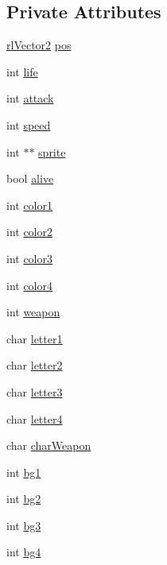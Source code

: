 \subsection*{Private Attributes}
\begin{DoxyCompactItemize}
\item 
\hyperlink{classrl_vector2}{rl\+Vector2} \hyperlink{class_entity_aedf0798376823559596033bfd52c1fa0}{pos}
\item 
int \hyperlink{class_entity_ab5a58d961897fb12cfb9a2a34cb80fe4}{life}
\item 
int \hyperlink{class_entity_ad7e09a1222e8cd9de3a843df03ebc37f}{attack}
\item 
int \hyperlink{class_entity_a12ea871d945d59cbf57b8f8f7d2179ed}{speed}
\item 
int $\ast$$\ast$ \hyperlink{class_entity_a0d38325f20f4355bf355e165b99231e6}{sprite}
\item 
bool \hyperlink{class_entity_a0d09a7e175d9dcfbfb359e5f74f2e692}{alive}
\item 
int \hyperlink{class_entity_ad22d4a6ba74304e1dbdd1a2a40aefb97}{color1}
\item 
int \hyperlink{class_entity_ade7823e7e53607944c4b439a1d6c2ddd}{color2}
\item 
int \hyperlink{class_entity_a7f8d011c124da5b94bd7582b3c87be67}{color3}
\item 
int \hyperlink{class_entity_a7eaf83e231e34f877a6a1e56631ea61d}{color4}
\item 
int \hyperlink{class_entity_aa4361bec43383b3fdfe53f53e71c93a6}{weapon}
\item 
char \hyperlink{class_entity_ad1de5aed7c640d39455f87ba0d3c192b}{letter1}
\item 
char \hyperlink{class_entity_a4522c9c985e62621e9bd5539b7207886}{letter2}
\item 
char \hyperlink{class_entity_a41b0a2fadb4a06a6b1fdec7d8099d529}{letter3}
\item 
char \hyperlink{class_entity_a1a7a52c0bfe4ec3f01715f7391c6ef2e}{letter4}
\item 
char \hyperlink{class_entity_a26e1ea3ec585b366da97be2a891dc8f2}{char\+Weapon}
\item 
int \hyperlink{class_entity_a7d6b490179c2a0db2b9710b85c9a9f6f}{bg1}
\item 
int \hyperlink{class_entity_a57bb7413333e67e8510bbba9ba3a58cf}{bg2}
\item 
int \hyperlink{class_entity_a9cb04d3796cb54b8bb616a0338089223}{bg3}
\item 
int \hyperlink{class_entity_aa0219d8b37b75cde4d9d2a8ba8b97517}{bg4}
$$
\end{DoxyCompactItemize}
